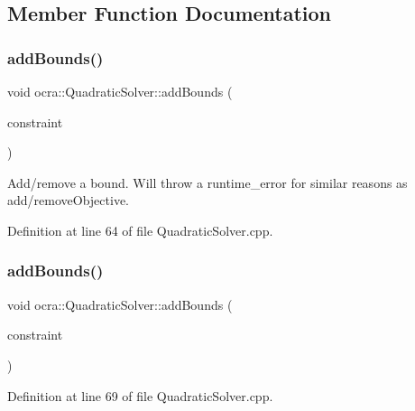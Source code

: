 \subsection{Member Function Documentation}
\hypertarget{classocra_1_1QuadraticSolver_ade074ba982ae752d2ee9f12329f89787}{}\label{classocra_1_1QuadraticSolver_ade074ba982ae752d2ee9f12329f89787} 
\subsubsection{\texorpdfstring{add\+Bounds()}{addBounds()}\hspace{0.1cm}{\footnotesize\ttfamily [1/2]}}
{\footnotesize\ttfamily void ocra\+::\+Quadratic\+Solver\+::add\+Bounds (\begin{DoxyParamCaption}\item[{\hyperlink{namespaceocra_a6e55fff77635080219964abc301abf18}{Bound\+Constraint} \&}]{constraint }\end{DoxyParamCaption})}

Add/remove a bound. Will throw a runtime\+\_\+error for similar reasons as add/remove\+Objective. 

Definition at line 64 of file Quadratic\+Solver.\+cpp.

\hypertarget{classocra_1_1QuadraticSolver_a4f58274f5f1d0eb6645b3e20bc09f090}{}\label{classocra_1_1QuadraticSolver_a4f58274f5f1d0eb6645b3e20bc09f090} 
\subsubsection{\texorpdfstring{add\+Bounds()}{addBounds()}\hspace{0.1cm}{\footnotesize\ttfamily [2/2]}}
{\footnotesize\ttfamily void ocra\+::\+Quadratic\+Solver\+::add\+Bounds (\begin{DoxyParamCaption}\item[{\hyperlink{namespaceocra_a5fc023ff4ef8f4b0cdf410e088090731}{Identity\+Constraint} \&}]{constraint }\end{DoxyParamCaption})}



Definition at line 69 of file Quadratic\+Solver.\+cpp.

